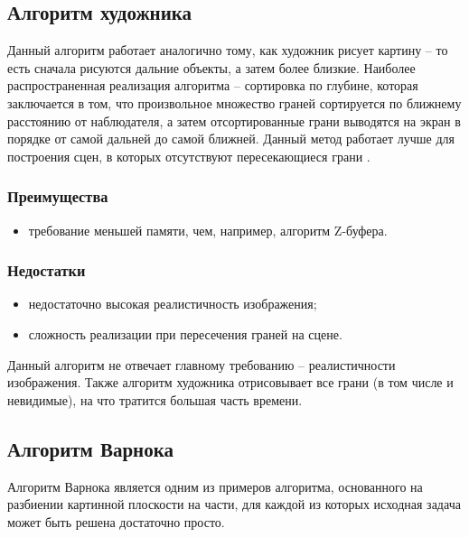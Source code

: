 \subsection{Алгоритм художника}
Данный алгоритм работает аналогично тому, как художник рисует картину – то есть сначала рисуются дальние объекты, а затем более близкие. Наиболее распространенная реализация алгоритма – сортировка по глубине, которая заключается в том, что произвольное множество граней сортируется по ближнему расстоянию от наблюдателя, а затем отсортированные грани выводятся на экран в порядке от самой дальней до самой ближней. Данный метод работает лучше для построения сцен, в которых отсутствуют пересекающиеся грани \cite{hudognik}. 

\subsubsection*{Преимущества}
\begin{itemize}
	\item	требование меньшей памяти, чем, например, алгоритм Z-буфера.
\end{itemize}

\subsubsection*{Недостатки}
\begin{itemize}
	\item	недостаточно высокая реалистичность изображения;
	\item	сложность реализации при пересечения граней на сцене.
\end{itemize}

Данный алгоритм не отвечает главному требованию – реалистичности изображения. Также алгоритм художника отрисовывает все грани (в том числе и невидимые), на что тратится большая часть времени.


\subsection{Алгоритм Варнока}

Алгоритм Варнока \cite{varnok} является одним из примеров алгоритма, основанного на разбиении картинной плоскости на части, для каждой из которых исходная задача может быть решена достаточно просто.

